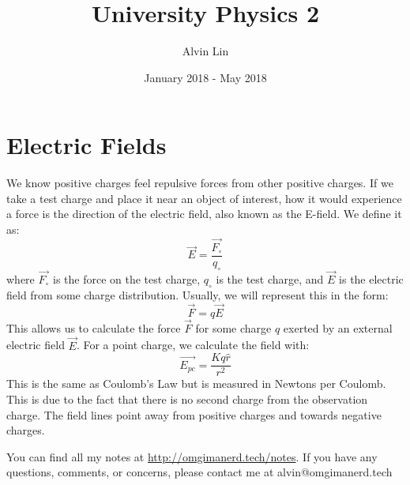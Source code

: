 \documentclass{math}
\title{University Physics 2}
\author{Alvin Lin}
\date{January 2018 - May 2018}
\begin{document}
\maketitle

\section*{Electric Fields}
We know positive charges feel repulsive forces from other positive charges. If
we take a test charge and place it near an object of interest, how it would
experience a force is the direction of the electric field, also known as the
E-field. We define it as:
\[ \vec{E} = \frac{\vec{F_{\circ}}}{q_{\circ}} \]
where \( \vec{F_{\circ}} \) is the force on the test charge, \( q_{\circ} \)
is the test charge, and \( \vec{E} \) is the electric field from some charge
distribution. Usually, we will represent this in the form:
\[ \vec{F} = q\vec{E} \]
This allows us to calculate the force \( \vec{F} \) for some charge \( q \)
exerted by an external electric field \( \vec{E} \). For a point charge, we
calculate the field with:
\[ \vec{E_{pc}} = \frac{Kq\hat{r}}{r^2} \]
This is the same as Coulomb's Law but is measured in Newtons per Coulomb. This
is due to the fact that there is no second charge from the observation charge.
The field lines point away from positive charges and towards negative charges.
\begin{center}
\end{center}

\begin{center}
  You can find all my notes at \url{http://omgimanerd.tech/notes}. If you have
  any questions, comments, or concerns, please contact me at
  alvin@omgimanerd.tech
\end{center}
\end{document}
